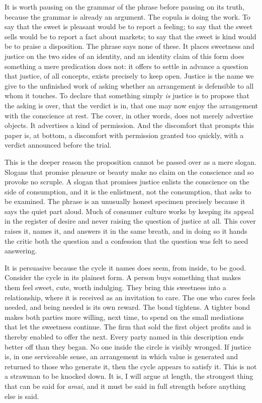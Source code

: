 \documentclass[11pt,a4paper]{article}
\begin{document}
It is worth pausing on the grammar of the phrase before pausing on its truth, because the grammar is already an argument. The copula is doing the work. To say that the sweet is pleasant would be to report a feeling; to say that the sweet sells would be to report a fact about markets; to say that the sweet is kind would be to praise a disposition. The phrase says none of these. It places sweetness and justice on the two sides of an identity, and an identity claim of this form does something a mere predication does not: it offers to settle in advance a question that justice, of all concepts, exists precisely to keep open. Justice is the name we give to the unfinished work of asking whether an arrangement is defensible to all whom it touches. To declare that something simply \textit{is} justice is to propose that the asking is over, that the verdict is in, that one may now enjoy the arrangement with the conscience at rest. The cover, in other words, does not merely advertise objects. It advertises a kind of permission. And the discomfort that prompts this paper is, at bottom, a discomfort with permission granted too quickly, with a verdict announced before the trial.

This is the deeper reason the proposition cannot be passed over as a mere slogan. Slogans that promise pleasure or beauty make no claim on the conscience and so provoke no scruple. A slogan that promises justice enlists the conscience on the side of consumption, and it is the enlistment, not the consumption, that asks to be examined. The phrase is an unusually honest specimen precisely because it says the quiet part aloud. Much of consumer culture works by keeping its appeal in the register of desire and never raising the question of justice at all. This cover raises it, names it, and answers it in the same breath, and in doing so it hands the critic both the question and a confession that the question was felt to need answering.

It is persuasive because the cycle it names does seem, from inside, to be good. Consider the cycle in its plainest form. A person buys something that makes them feel sweet, cute, worth indulging. They bring this sweetness into a relationship, where it is received as an invitation to care. The one who cares feels needed, and being needed is its own reward. The bond tightens. A tighter bond makes both parties more willing, next time, to spend on the small mediations that let the sweetness continue. The firm that sold the first object profits and is thereby enabled to offer the next. Every party named in this description ends better off than they began. No one inside the circle is visibly wronged. If justice is, in one serviceable sense, an arrangement in which value is generated and returned to those who generate it, then the cycle appears to satisfy it. This is not a strawman to be knocked down. It is, I will argue at length, the strongest thing that can be said for \textit{amai}, and it must be said in full strength before anything else is said.
\end{document}

